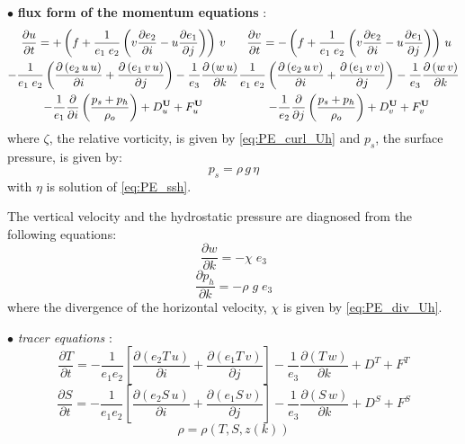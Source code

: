 \documentclass[../main/NEMO_manual]{subfiles}
\begin{document}
\vspace{+10pt}
$\bullet$ \textbf{flux form of the momentum equations} :
\begin{subequations}
  \begin{multline*}
    \frac{\partial u}{\partial t}=
    +   \left( { f + \frac{1}{e_1 \; e_2}
        \left( 	 v \frac{\partial e_2}{\partial i}
          -u \frac{\partial e_1}{\partial j} 	\right)} 	\right) \, v    \\
    - \frac{1}{e_1 \; e_2} 	\left(
      \frac{\partial \left( {e_2 \,u\,u} \right)}{\partial i}
		+			\frac{\partial \left( {e_1 \,v\,u} \right)}{\partial j}	\right)
    - \frac{1}{e_3 }\frac{\partial \left( {         w\,u} \right)}{\partial k}    \\
    -   \frac{1}{e_1 }\frac{\partial}{\partial i}\left( \frac{p_s+p_h }{\rho_o}   \right)
    +   D_u^{\vect{U}} +   F_u^{\vect{U}}
  \end{multline*}
  \begin{multline*}
    \frac{\partial v}{\partial t}=
    -   \left( { f + \frac{1}{e_1 \; e_2}
        \left( 	 v \frac{\partial e_2}{\partial i}
          -u \frac{\partial e_1}{\partial j} 	\right)} 	\right) \, u   \\
    \frac{1}{e_1 \; e_2} 	\left(
      \frac{\partial \left( {e_2 \,u\,v} \right)}{\partial i}
		+			\frac{\partial \left( {e_1 \,v\,v} \right)}{\partial j}	\right)
    - \frac{1}{e_3 } \frac{\partial \left( {        w\,v} \right)}{\partial k}    \\
    -   \frac{1}{e_2 }\frac{\partial }{\partial j}\left( \frac{p_s+p_h }{\rho_o}    \right)
    +  D_v^{\vect{U}} +  F_v^{\vect{U}}
  \end{multline*}
\end{subequations}
where $\zeta$, the relative vorticity, is given by \autoref{eq:PE_curl_Uh} and
$p_s $, the surface pressure, is given by:
\[
  p_s =  \rho \,g \,\eta
\]
with $\eta$ is solution of \autoref{eq:PE_ssh}.

The vertical velocity and the hydrostatic pressure are diagnosed from the following equations:
\[
  \frac{\partial w}{\partial k}=-\chi \;e_3
\]
\[
  \frac{\partial p_h }{\partial k}=-\rho \;g\;e_3
\]
where the divergence of the horizontal velocity, $\chi$ is given by \autoref{eq:PE_div_Uh}.

\vspace{+10pt}
$\bullet$ \textit{tracer equations} :
\[
  \frac{\partial T}{\partial t} =
  -\frac{1}{e_1 e_2 }\left[ {	   \frac{\partial \left( {e_2 T\,u} \right)}{\partial i}
      +\frac{\partial \left( {e_1 T\,v} \right)}{\partial j}} \right]
  -\frac{1}{e_3 }\frac{\partial \left( {T\,w} \right)}{\partial k} + D^T + F^T
\]
\[
  \frac{\partial S}{\partial t} =
  -\frac{1}{e_1 e_2 }\left[ 	  {\frac{\partial \left( {e_2 S\,u} \right)}{\partial i}
      +\frac{\partial \left( {e_1 S\,v} \right)}{\partial j}} \right]
  -\frac{1}{e_3 }\frac{\partial \left( {S\,w} \right)}{\partial k} + D^S + F^S
\]
\[
  \rho =\rho \left( {T,S,z(k)} \right)
\]
\end{document}
